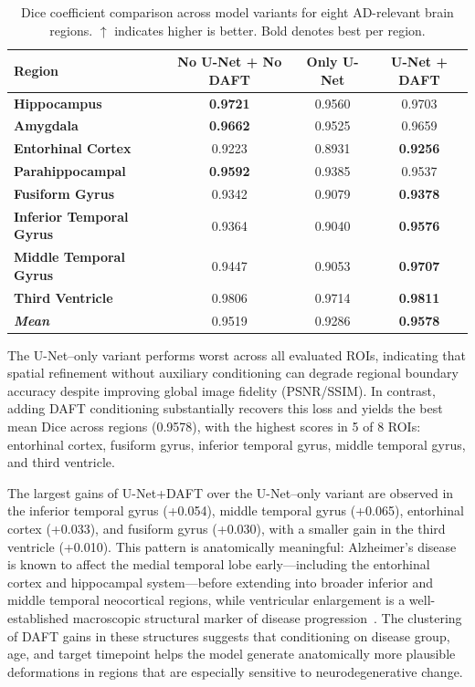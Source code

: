 \begin{table}[ht]
\centering
\caption{Dice coefficient comparison across model variants for eight AD-relevant brain regions. $\uparrow$ indicates higher is better. Bold denotes best per region.}
\small
\begin{tabular}{>{\bfseries}lccc}
\toprule
Region & No U-Net + No DAFT & Only U-Net & U-Net + DAFT \\
\midrule
Hippocampus             & \textbf{0.9721} & 0.9560 & 0.9703 \\
Amygdala                & \textbf{0.9662} & 0.9525 & 0.9659 \\
Entorhinal Cortex       & 0.9223 & 0.8931 & \textbf{0.9256} \\
Parahippocampal         & \textbf{0.9592} & 0.9385 & 0.9537 \\
Fusiform Gyrus          & 0.9342 & 0.9079 & \textbf{0.9378} \\
Inferior Temporal Gyrus & 0.9364 & 0.9040 & \textbf{0.9576} \\
Middle Temporal Gyrus   & 0.9447 & 0.9053 & \textbf{0.9707} \\
Third Ventricle         & 0.9806 & 0.9714 & \textbf{0.9811} \\
\midrule
\textit{Mean}           & 0.9519 & 0.9286 & \textbf{0.9578} \\
\bottomrule
\end{tabular}
\label{tab:model_variant_dice}
\end{table}

The U-Net--only variant performs worst across all evaluated ROIs, indicating that spatial refinement without auxiliary conditioning can degrade regional boundary accuracy despite improving global image fidelity (PSNR/SSIM). In contrast, adding DAFT conditioning substantially recovers this loss and yields the best mean Dice across regions (0.9578), with the highest scores in 5 of 8 ROIs: entorhinal cortex, fusiform gyrus, inferior temporal gyrus, middle temporal gyrus, and third ventricle.

The largest gains of U-Net+DAFT over the U-Net--only variant are observed in the inferior temporal gyrus (+0.054), middle temporal gyrus (+0.065), entorhinal cortex (+0.033), and fusiform gyrus (+0.030), with a smaller gain in the third ventricle (+0.010). This pattern is anatomically meaningful: Alzheimer's disease is known to affect the medial temporal lobe early---including the entorhinal cortex and hippocampal system---before extending into broader inferior and middle temporal neocortical regions, while ventricular enlargement is a well-established macroscopic structural marker of disease progression~\cite{braak1991neuropathological,jack2018nia}. The clustering of DAFT gains in these structures suggests that conditioning on disease group, age, and target timepoint helps the model generate anatomically more plausible deformations in regions that are especially sensitive to neurodegenerative change.

